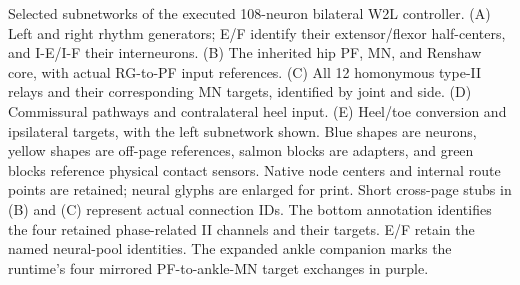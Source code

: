 \caption[Current bilateral W2L neural subsystems]{Selected subnetworks of the executed 108-neuron bilateral W2L controller. (A) Left and right rhythm generators; E/F identify their extensor/flexor half-centers, and I-E/I-F their interneurons. (B) The inherited hip PF, MN, and Renshaw core, with actual RG-to-PF input references. (C) All 12 homonymous type-II relays and their corresponding MN targets, identified by joint and side. (D) Commissural pathways and contralateral heel input. (E) Heel/toe conversion and ipsilateral targets, with the left subnetwork shown. Blue shapes are neurons, yellow shapes are off-page references, salmon blocks are adapters, and green blocks reference physical contact sensors. Native node centers and internal route points are retained; neural glyphs are enlarged for print. Short cross-page stubs in (B) and (C) represent actual connection IDs. The bottom annotation identifies the four retained phase-related II channels and their targets. E/F retain the named neural-pool identities. The expanded ankle companion marks the runtime's four mirrored PF-to-ankle-MN target exchanges in purple.}
